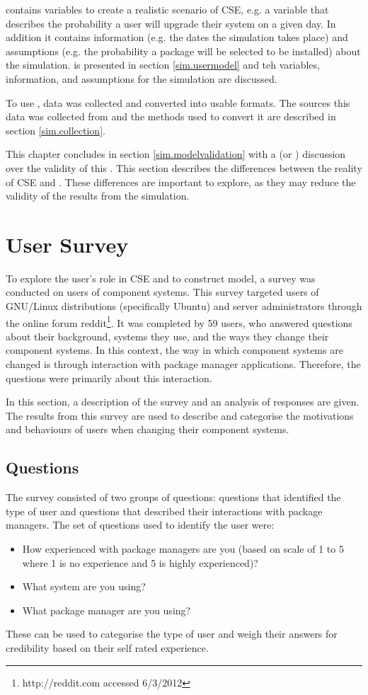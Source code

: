 \usermodel contains variables to create a realistic scenario of CSE, e.g. a variable that describes the probability a user will upgrade their system on a given day.
In addition it contains information (e.g. the dates the simulation takes place) and assumptions (e.g. the probability a package will be selected to be installed) about the simulation.
\usermodel is presented in section \ref{sim.usermodel} and teh variables, information, and assumptions for the simulation are discussed.

To use \usermodel, data was collected and converted into usable formats.
The sources this data was collected from and the methods used to convert it are described in section \ref{sim.collection}.

This chapter concludes in section \ref{sim.modelvalidation} with a (or ) discussion over the validity of this \usermodel.
This section describes the differences between the reality of CSE and \usermodel.
These differences are important to explore, as they may reduce the validity of the results from the simulation.

\section{User Survey}
\label{strat.usersurvey}
To explore the user's role in CSE and to construct \usermodel model, a survey was conducted on users of component systems.
This survey targeted users of GNU/Linux distributions (specifically Ubuntu) and server administrators through the online forum reddit\footnote{http://reddit.com accessed 6/3/2012}.
It was completed by 59 users, who answered questions about their background, systems they use, and the ways they change their component systems.
In this context, the way in which component systems are changed is through interaction with package manager applications. 
Therefore, the questions were primarily about this interaction.

In this section, a description of the survey and an analysis of responses are given.
The results from this survey are used to describe and categorise the motivations and behaviours of users when changing their component systems.

\subsection{Questions}
The survey consisted of two groups of questions: questions that identified the type of user and questions that described their interactions with package managers.
The set of questions used to identify the user were:
\begin{itemize}
  \item How experienced with package managers are you (based on scale of 1 to 5 where 1 is no experience and 5 is highly experienced)? 
  \item What system are you using?
  \item What package manager are you using?
\end{itemize}
These can be used to categorise the type of user and weigh their answers for credibility based on their self rated experience.

